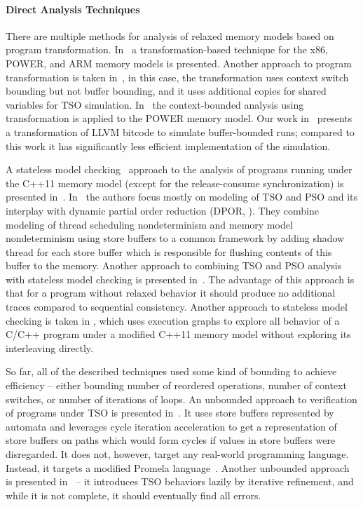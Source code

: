 \paragraph{Direct Analysis Techniques}

There are multiple methods for analysis of relaxed memory models based on program transformation.
In~\cite{Alglave2013} a transformation-based technique for the x86, POWER, and ARM memory models is presented.
Another approach to program transformation is taken in~\cite{Atig2011}, in this case, the transformation uses context switch bounding but not buffer bounding, and it uses additional copies for shared variables for TSO simulation.
In~\cite{Abdulla2017} the context-bounded analysis using transformation is applied to the POWER memory model.
Our work in~\cite{SRB15weakmem} presents a transformation of LLVM bitcode to simulate buffer-bounded \xtso runs; compared to this work it has significantly less efficient implementation of the \xtso simulation.

A stateless model checking~\cite{Godefroid1997} approach to the analysis of programs running under the C++11 memory model (except for the release-consume synchronization) is presented in~\cite{Norris2013}.
In~\cite{Zhang2015} the authors focus mostly on modeling of TSO and PSO and its interplay with dynamic partial order reduction (DPOR, \cite{Flanagan2005dpor}).
They combine modeling of thread scheduling nondeterminism and memory model nondeterminism using store buffers to a common framework by adding shadow thread for each store buffer which is responsible for flushing contents of this buffer to the memory.
Another approach to combining TSO and PSO analysis with stateless model checking is presented in~\cite{Abdulla2015}.
The advantage of this approach is that for a program without relaxed behavior it should produce no additional traces compared to sequential consistency.
Another approach to stateless model checking is taken in \cite{Kokologiannakis2017}, which uses execution graphs to explore all behavior of a C/C++ program under a modified C++11 memory model without exploring its interleaving directly.

So far, all of the described techniques used some kind of bounding to achieve efficiency -- either bounding number of reordered operations, number of context switches, or number of iterations of loops.
An unbounded approach to verification of programs under TSO is presented in~\cite{Linden2010}.
It uses store buffers represented by automata and leverages cycle iteration acceleration to get a representation of store buffers on paths which would form cycles if values in store buffers were disregarded.
It does not, however, target any real-world programming language.
Instead, it targets a modified Promela language~\cite{Holzmann1997}.
Another unbounded approach is presented in~\cite{Bouajjani2015} -- it introduces TSO behaviors lazily by iterative refinement, and while it is not complete, it should eventually find all errors.


